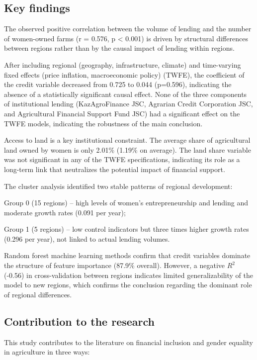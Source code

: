 ﻿\documentclass[pdflatex,sn-mathphys-ay]{sn-jnl}
\begin{document}
\subsection{Key findings}

The observed positive correlation between the volume of lending and the
number of women-owned farms (r = 0.576, p \textless{} 0.001) is driven
by structural differences between regions rather than by the causal
impact of lending within regions.

After including regional (geography, infrastructure, climate) and
time-varying fixed effects (price inflation, macroeconomic policy)
(TWFE), the coefficient of the credit variable decreased from 0.725 to
0.044 (p=0.596), indicating the absence of a statistically significant
causal effect. None of the three components of institutional lending
(KazAgroFinance JSC, Agrarian Credit Corporation JSC, and Agricultural
Financial Support Fund JSC) had a significant effect on the TWFE models,
indicating the robustness of the main conclusion.

Access to land is a key institutional constraint. The average share of
agricultural land owned by women is only 2.01\% (1.19\% on average). The
land share variable was not significant in any of the TWFE
specifications, indicating its role as a long-term link that neutralizes
the potential impact of financial support.

The cluster analysis identified two stable patterns of regional development:

Group 0 (15 regions) -- high levels of women's entrepreneurship and
lending and moderate growth rates (0.091 per year);

Group 1 (5 regions) -- low control indicators but three times higher
growth rates (0.296 per year), not linked to actual lending volumes.

Random forest machine learning methods confirm that credit variables
dominate the structure of feature importance (87.9\% overall). However,
a negative $R^2$ (-0.56) in cross-validation between regions indicates
limited generalizability of the model to new regions, which confirms the
conclusion regarding the dominant role of regional differences.

\subsection{Contribution to the research}

This study contributes to the literature on financial inclusion and
gender equality in agriculture in three ways:
\end{document}
